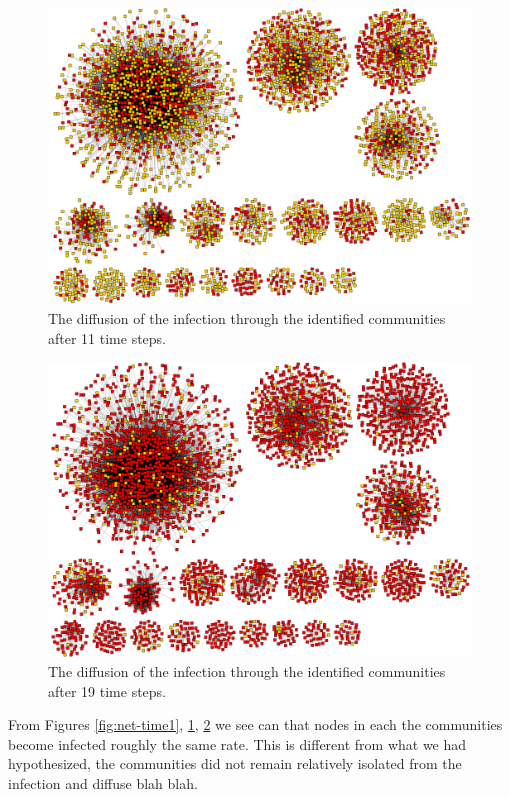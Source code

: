 \documentclass[12pt, oneside, openany]{article} %
\begin{document}
\begin{figure}
\centering
    \includegraphics[scale=0.25]{step11.png}
    \caption{The diffusion of the infection through the identified communities after 11 time steps.}
    \label{fig:net-time11}
\end{figure}

\begin{figure}
\centering
    \includegraphics[scale=0.25]{step19.png}
    \caption{The diffusion of the infection through the identified communities after 19 time steps.}
    \label{fig:net-time19}
\end{figure}

From Figures \ref{fig:net-time1}, \ref{fig:net-time11}, \ref{fig:net-time19} we see can that nodes in each the communities become infected roughly the same rate. This is different from what we had hypothesized, the communities did not remain relatively isolated from the infection and diffuse blah blah.
\end{document}

